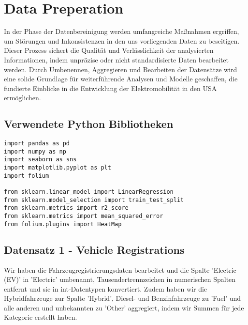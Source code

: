 \section{Data Preperation}

In der Phase der Datenbereinigung werden umfangreiche Maßnahmen ergriffen, um Störungen und Inkonsistenzen in den uns vorliegenden Daten zu beseitigen. Dieser Prozess sichert die Qualität und Verlässlichkeit der analysierten Informationen, indem unpräzise oder nicht standardisierte Daten bearbeitet werden. Durch Umbenennen, Aggregieren und Bearbeiten der Datensätze wird eine solide Grundlage für weiterführende Analysen und Modelle geschaffen, die fundierte Einblicke in die Entwicklung der Elektromobilität in den USA ermöglichen.

\subsection{Verwendete Python Bibliotheken}

\begin{verbatim}
import pandas as pd
import numpy as np
import seaborn as sns
import matplotlib.pyplot as plt
import folium

from sklearn.linear_model import LinearRegression
from sklearn.model_selection import train_test_split
from sklearn.metrics import r2_score
from sklearn.metrics import mean_squared_error
from folium.plugins import HeatMap
\end{verbatim}

\subsection{Datensatz 1 - Vehicle Registrations}

Wir haben die Fahrzeugregistrierungsdaten bearbeitet und die Spalte 'Electric (EV)' in 'Electric' umbenannt, Tausendertrennzeichen in numerischen Spalten entfernt und sie in int-Datentypen konvertiert. Zudem haben wir die Hybridfahrzeuge zur Spalte 'Hybrid', Diesel- und Benzinfahrzeuge zu 'Fuel' und alle anderen und unbekannten zu 'Other' aggregiert, indem wir Summen für jede Kategorie erstellt haben.

